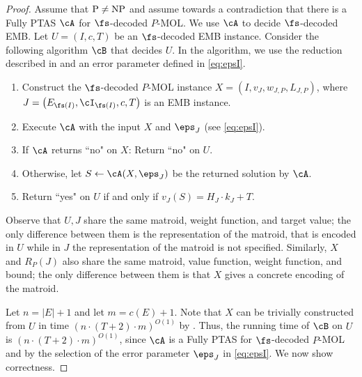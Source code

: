 \begin{proof}
	Assume that $\textnormal{P} \neq \textnormal{NP}$ and assume towards a contradiction that there is a Fully PTAS $\cA$ for $\fs$-decoded $P$-MOL. We use $\cA$ to decide $\fs$-decoded EMB. Let $U = (I,c,T)$  be an $\fs$-decoded EMB instance. %
	Consider the following algorithm $\cB$ that decides $U$. In the algorithm, we use the reduction described in  and an error parameter defined in \eqref{eq:epsI}. 
	\begin{enumerate}
		\item Construct the $\fs$-decoded $P$-MOL instance $X = (I,v_J,w_{J,P},L_{J,P})$, where \newline $J = \left(E_{\fs(I)},\cI_{\fs (I)},c,T\right)$ is an EMB instance.\label{step:1D} 
		\item 
		Execute $\cA$ with the input $X$ and $\eps_J$ (see \eqref{eq:epsI}). \label{step:2D} 
		\item If $\cA$ returns ``no" on $X$: Return ``no" on $U$. %
		\item Otherwise, let $S \leftarrow \cA(X,\eps_J)$ be the returned solution by $\cA$.\label{step:4D} 
		\item Return ``yes" on $U$ %
		if and only if $v_J(S) = H_J \cdot k_J+T$. \label{step:5D} 
	\end{enumerate}
	
	Observe that $U,J$ share the same matroid, weight function, and target value; the only difference between them is the representation of the matroid, that is encoded in $U$ while in $J$ the representation of the matroid is not specified. Similarly, $X$ and $R_P(J)$ also share the same matroid, value function, weight function, and bound; the only difference between them is that $X$ gives a concrete encoding of the matroid.  
	
	Let $n = |E|+1$ and let $m = c(E)+1$. Note that $X$ can be trivially constructed from $U$ in time $\left(n \cdot (T+2) \cdot m\right)^{O(1)}$ by . %
	Thus, the running time of $\cB$ on $U$ is $\left(n \cdot (T+2) \cdot m\right)^{O(1)}$, since $\cA$ is a Fully PTAS for $\fs$-decoded $P$-MOL and by the selection of the error parameter  $\eps_J$ in \eqref{eq:epsI}. %
	We now show correctness. %
	

\end{proof}
